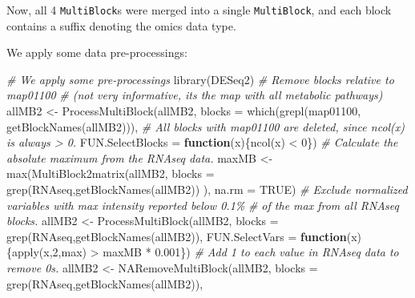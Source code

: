 \documentclass[
]{book}
\newenvironment{Shaded}{\begin{snugshade}}{\end{snugshade}}
\newcommand{\AttributeTok}[1]{\textcolor[rgb]{0.77,0.63,0.00}{#1}}
\newcommand{\CommentTok}[1]{\textcolor[rgb]{0.56,0.35,0.01}{\textit{#1}}}
\newcommand{\ConstantTok}[1]{\textcolor[rgb]{0.00,0.00,0.00}{#1}}
\newcommand{\ControlFlowTok}[1]{\textcolor[rgb]{0.13,0.29,0.53}{\textbf{#1}}}
\newcommand{\DecValTok}[1]{\textcolor[rgb]{0.00,0.00,0.81}{#1}}
\newcommand{\FloatTok}[1]{\textcolor[rgb]{0.00,0.00,0.81}{#1}}
\newcommand{\FunctionTok}[1]{\textcolor[rgb]{0.00,0.00,0.00}{#1}}
\newcommand{\NormalTok}[1]{#1}
\newcommand{\OtherTok}[1]{\textcolor[rgb]{0.56,0.35,0.01}{#1}}
\newcommand{\SpecialCharTok}[1]{\textcolor[rgb]{0.00,0.00,0.00}{#1}}
\newcommand{\StringTok}[1]{\textcolor[rgb]{0.31,0.60,0.02}{#1}}
\begin{document}
Now, all 4 \texttt{MultiBlock}s were merged into a single \texttt{MultiBlock}, and each block
contains a suffix denoting the omics data type.

We apply some data pre-processings:

\begin{Shaded}
\begin{Highlighting}[]
\CommentTok{\# We apply some pre{-}processings}
  \FunctionTok{library}\NormalTok{(DESeq2)}
  \CommentTok{\# Remove blocks relative to map01100}
  \CommentTok{\# (not very informative, it\textquotesingle{}s the map with all metabolic pathways)}
\NormalTok{  allMB2 }\OtherTok{\textless{}{-}} \FunctionTok{ProcessMultiBlock}\NormalTok{(allMB2,}
    \AttributeTok{blocks =} \FunctionTok{which}\NormalTok{(}\FunctionTok{grepl}\NormalTok{(}\StringTok{\textquotesingle{}map01100\textquotesingle{}}\NormalTok{, }\FunctionTok{getBlockNames}\NormalTok{(allMB2))),}
    \CommentTok{\# All blocks with map01100 are deleted, since ncol(x) is always \textgreater{} 0.}
    \AttributeTok{FUN.SelectBlocks =} \ControlFlowTok{function}\NormalTok{(x)\{}\FunctionTok{ncol}\NormalTok{(x) }\SpecialCharTok{\textless{}} \DecValTok{0}\NormalTok{\})}
  \CommentTok{\# Calculate the absolute maximum from the RNAseq data.}
\NormalTok{  maxMB }\OtherTok{\textless{}{-}} \FunctionTok{max}\NormalTok{(}\FunctionTok{MultiBlock2matrix}\NormalTok{(allMB2,}
                                 \AttributeTok{blocks =} \FunctionTok{grep}\NormalTok{(}\StringTok{\textquotesingle{}RNAseq\textquotesingle{}}\NormalTok{,}\FunctionTok{getBlockNames}\NormalTok{(allMB2))}
\NormalTok{                                 ),}
               \AttributeTok{na.rm =} \ConstantTok{TRUE}\NormalTok{)}
  \CommentTok{\# Exclude normalized variables with max intensity reported below 0.1\%}
  \CommentTok{\# of the max from all RNAseq blocks.}
\NormalTok{  allMB2 }\OtherTok{\textless{}{-}} \FunctionTok{ProcessMultiBlock}\NormalTok{(allMB2,}
     \AttributeTok{blocks =} \FunctionTok{grep}\NormalTok{(}\StringTok{\textquotesingle{}RNAseq\textquotesingle{}}\NormalTok{,}\FunctionTok{getBlockNames}\NormalTok{(allMB2)),}
     \AttributeTok{FUN.SelectVars =} \ControlFlowTok{function}\NormalTok{(x) \{}\FunctionTok{apply}\NormalTok{(x,}\DecValTok{2}\NormalTok{,max) }\SpecialCharTok{\textgreater{}}\NormalTok{ maxMB }\SpecialCharTok{*} \FloatTok{0.001}\NormalTok{\})}
  \CommentTok{\# Add 1 to each value in RNAseq data to remove 0s.}
\NormalTok{  allMB2 }\OtherTok{\textless{}{-}} \FunctionTok{NARemoveMultiBlock}\NormalTok{(allMB2,}
     \AttributeTok{blocks =} \FunctionTok{grep}\NormalTok{(}\StringTok{\textquotesingle{}RNAseq\textquotesingle{}}\NormalTok{,}\FunctionTok{getBlockNames}\NormalTok{(allMB2)),}

\end{Highlighting}
\end{Shaded}
\end{document}
